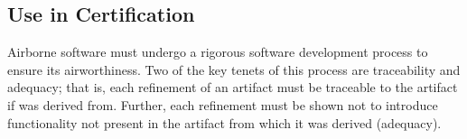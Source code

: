 %
%
%

\subsection{Use in Certification}
Airborne software must undergo a rigorous software development process to ensure its airworthiness.
Two of the key tenets of this process are traceability and adequacy; that is, each refinement of an artifact must be traceable to the artifact if was derived from. Further, each refinement must be shown not to introduce functionality not present in the artifact from which it was derived (adequacy).
%

